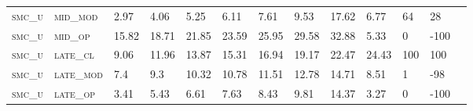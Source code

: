 \begin{sidewaystable}[!htbp]
\begin{tabular}{@{}lllllllllllll@{}}
\footnotesize \textsc{smc\_u}      & \footnotesize \textsc{mid\_mod  }               & \footnotesize 2.97            & \footnotesize 4.06            & \footnotesize 5.25             & \footnotesize 6.11             & \footnotesize 7.61             & \footnotesize 9.53             & \footnotesize 17.62       & \footnotesize 6.77     & \footnotesize 64     & \footnotesize 28       \\
\footnotesize \textsc{smc\_u}      & \footnotesize \textsc{mid\_op   }               & \footnotesize 15.82           & \footnotesize 18.71           & \footnotesize 21.85            & \footnotesize 23.59            & \footnotesize 25.95            & \footnotesize 29.58            & \footnotesize 32.88       & \footnotesize 5.33     & \footnotesize 0      & \footnotesize -100     \\
\footnotesize \textsc{smc\_u}      & \footnotesize \textsc{late\_cl  }               & \footnotesize 9.06            & \footnotesize 11.96           & \footnotesize 13.87            & \footnotesize 15.31            & \footnotesize 16.94            & \footnotesize 19.17            & \footnotesize 22.47       & \footnotesize 24.43    & \footnotesize 100    & \footnotesize 100      \\
\footnotesize \textsc{smc\_u}      & \footnotesize \textsc{late\_mod }               & \footnotesize 7.4             & \footnotesize 9.3             & \footnotesize 10.32            & \footnotesize 10.78            & \footnotesize 11.51            & \footnotesize 12.78            & \footnotesize 14.71       & \footnotesize 8.51     & \footnotesize 1      & \footnotesize -98      \\
\footnotesize \textsc{smc\_u}      & \footnotesize \textsc{late\_op  }               & \footnotesize 3.41            & \footnotesize 5.43            & \footnotesize 6.61             & \footnotesize 7.63             & \footnotesize 8.43             & \footnotesize 9.81             & \footnotesize 14.37       & \footnotesize 3.27     & \footnotesize 0      & \footnotesize -100     \\
\end{tabular}
\end{sidewaystable}


